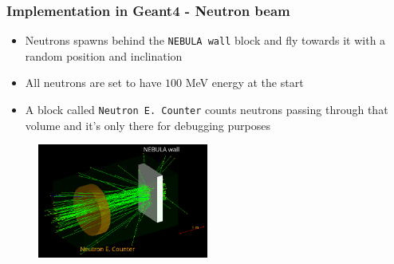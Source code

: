\begin{frame}
\frametitle{Implementation in Geant4 - Neutron beam}

\begin{exampleblock}{}
	\begin{itemize}
		\item Neutrons spawns behind the \texttt{NEBULA wall} block and fly towards it with a random position and inclination
		\item All neutrons are set to have $100$ MeV energy at the start
		\item A block called \texttt{Neutron E. Counter} counts neutrons passing through that volume and it's only there for debugging purposes
	\end{itemize}
\end{exampleblock}

\begin{figure}
	\includegraphics[width=0.5\textwidth]{images/nebula_3d.png}
\end{figure}

\end{frame}